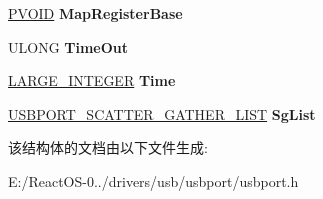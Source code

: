 \begin{DoxyCompactItemize}
\hyperlink{interfacevoid}{P\+V\+O\+ID} {\bfseries Map\+Register\+Base}
\item 
\mbox{\label{struct___u_s_b_p_o_r_t___t_r_a_n_s_f_e_r_acc291e8ddba8239b5fc221e9346b479b}} 
U\+L\+O\+NG {\bfseries Time\+Out}
\item 
\mbox{\label{struct___u_s_b_p_o_r_t___t_r_a_n_s_f_e_r_a8bf451cb9f839438e08bf5c6263b0b2b}} 
\hyperlink{union___l_a_r_g_e___i_n_t_e_g_e_r}{L\+A\+R\+G\+E\+\_\+\+I\+N\+T\+E\+G\+ER} {\bfseries Time}
\item 
\mbox{\label{struct___u_s_b_p_o_r_t___t_r_a_n_s_f_e_r_af2086c359313cb692657dba9a1fa508b}} 
\hyperlink{struct___u_s_b_p_o_r_t___s_c_a_t_t_e_r___g_a_t_h_e_r___l_i_s_t}{U\+S\+B\+P\+O\+R\+T\+\_\+\+S\+C\+A\+T\+T\+E\+R\+\_\+\+G\+A\+T\+H\+E\+R\+\_\+\+L\+I\+ST} {\bfseries Sg\+List}
\end{DoxyCompactItemize}


该结构体的文档由以下文件生成\+:\begin{DoxyCompactItemize}
\item 
E\+:/\+React\+O\+S-\/0../drivers/usb/usbport/usbport.\+h\end{DoxyCompactItemize}
